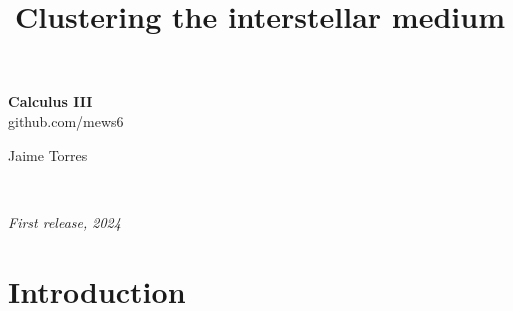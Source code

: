 \documentclass[11pt,fleqn]{book} %
\begin{document}
\title{Clustering the interstellar medium}


\begingroup
\thispagestyle{empty}
\centering
\vspace*{5cm}
\par\normalfont\fontsize{35}{35}\sffamily\selectfont
\textbf{Calculus III}\\
{\LARGE github.com/mews6}\par %
\vspace*{1cm}
{Jaime Torres}\par %
\endgroup


\newpage
~\vfill
\thispagestyle{empty}


\noindent \textit{First release, 2024} %



\pagestyle{empty} %

\tableofcontents %


\pagestyle{fancy} %



\chapter{Introduction}
\end{document}
